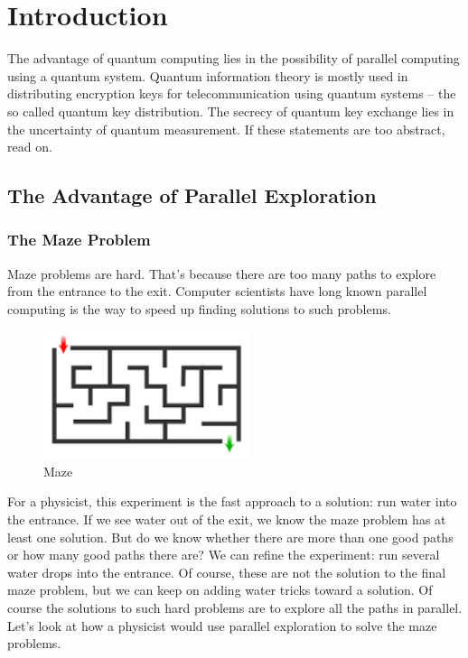 \documentclass{book}
\begin{document}
\mainmatter

\chapter{Introduction}
The advantage of quantum computing lies in the possibility of parallel computing using a quantum system. Quantum information theory is mostly used in distributing encryption keys for telecommunication using quantum systems -- the so called quantum key distribution. The secrecy of quantum key exchange lies in the uncertainty of quantum measurement. If these statements are too abstract, read on.

\section{The Advantage of Parallel Exploration}
\subsection{The Maze Problem}
Maze problems are hard. That's because there are too many paths to explore from the entrance to the exit. Computer scientists have long known parallel computing is the way to speed up finding solutions to such problems.

\begin{figure}[ht]
\includegraphics[width=6cm]{maze.png}
\caption{Maze}
\label{Maze}
\end{figure}

For a physicist, this experiment is the fast approach to a solution: run water into the entrance. If we see water out of the exit, we know the maze problem has at least one solution. But do we know whether there are more than one good paths or how many good paths there are? We can refine the experiment: run several water drops into the entrance. Of course, these are not the solution to the final maze problem, but we can keep on adding water tricks toward a solution.
Of course the solutions to such hard problems are to explore all the paths in parallel. Let’s look at how a physicist would use parallel exploration to solve the maze problems.
\end{document}
